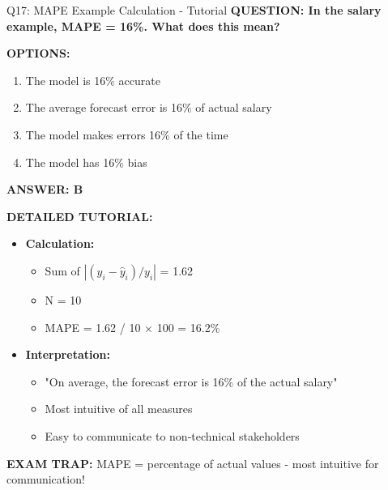 \documentclass[8pt]{beamer}
\begin{document}
	\begin{frame}{Q17: MAPE Example Calculation - Tutorial}
		\fontsize{6.5}{7.5}\selectfont
		\textbf{QUESTION: In the salary example, MAPE = 16\%. What does this mean?}
		
		\vspace{0.1cm}
		\textbf{OPTIONS:}
		\begin{enumerate}
			\item The model is 16\% accurate
			\item The average forecast error is 16\% of actual salary
			\item The model makes errors 16\% of the time
			\item The model has 16\% bias
		\end{enumerate}
		
		\vspace{0.1cm}
		\textcolor{myblue}{\textbf{ANSWER: B}}
		
		\vspace{0.1cm}
		\textbf{DETAILED TUTORIAL:}
		\begin{itemize}
			\item \textbf{Calculation:}
			\begin{itemize}
				\item Sum of $|(y_i - \hat{y}_i)/y_i|$ = 1.62
				\item N = 10
				\item MAPE = 1.62 / 10 × 100 = 16.2\%
			\end{itemize}
			\item \textbf{Interpretation:}
			\begin{itemize}
				\item "On average, the forecast error is 16\% of the actual salary"
				\item Most intuitive of all measures
				\item Easy to communicate to non-technical stakeholders
			\end{itemize}
		\end{itemize}
		
		\textcolor{myred}{\textbf{EXAM TRAP:}} MAPE = \textcolor{myblue}{percentage of actual values} - most intuitive for communication!
	\end{frame}
	
\end{document}
